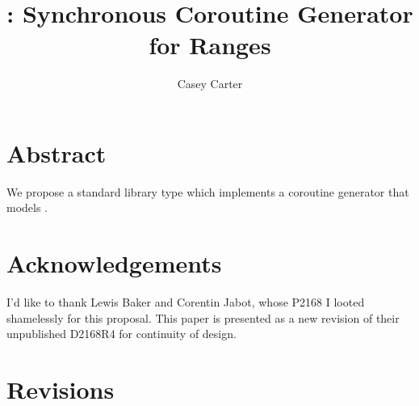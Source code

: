 \documentclass{wg21}
\title{\tcode{std::generator}: Synchronous Coroutine Generator for Ranges}
\author{Casey Carter}{Casey@Carter.net}
\begin{document}
\maketitle

\section{Abstract}

We propose a standard library type 
which implements a coroutine generator
that models .

\section{Acknowledgements}

I'd like to thank Lewis Baker and Corentin Jabot,
whose P2168 \cite{P2168R3} I looted shamelessly for this proposal.
This paper is presented as a new revision of
their unpublished D2168R4 for continuity of design.

\section{Revisions}

\end{document}
